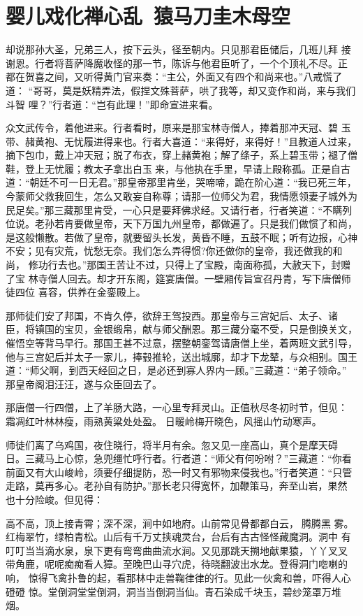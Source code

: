 \chapter{婴儿戏化禅心乱~猿马刀圭木母空}

却说那孙大圣，兄弟三人，按下云头，径至朝内。只见那君臣储后，几班儿拜
接谢恩。行者将菩萨降魔收怪的那一节，陈诉与他君臣听了，一个个顶礼不尽。正
都在贺喜之间，又听得黄门官来奏：“主公，外面又有四个和尚来也。”八戒慌了道：
“哥哥，莫是妖精弄法，假捏文殊菩萨，哄了我等，却又变作和尚，来与我们斗智
哩？”行者道：“岂有此理！”即命宣进来看。

众文武传令，着他进来。行者看时，原来是那宝林寺僧人，捧着那冲天冠、碧
玉带、赭黄袍、无忧履进得来也。行者大喜道：“来得好，来得好！”且教道人过来，
摘下包巾，戴上冲天冠；脱了布衣，穿上赭黄袍；解了绦子，系上碧玉带；褪了僧
鞋，登上无忧履；教太子拿出白玉来，与他执在手里，早请上殿称孤。正是自古
道：“朝廷不可一日无君。”那皇帝那里肯坐，哭啼啼，跪在阶心道：“我已死三年，
今蒙师父救我回生，怎么又敢妄自称尊；请那一位师父为君，我情愿领妻子城外为
民足矣。”那三藏那里肯受，一心只是要拜佛求经。又请行者，行者笑道：“不瞒列
位说。老孙若肯要做皇帝，天下万国九州皇帝，都做遍了。只是我们做惯了和尚，
是这般懒散。若做了皇帝，就要留头长发，黄昏不睡，五鼓不眠；听有边报，心神
不安；见有灾荒，忧愁无奈。我们怎么弄得惯?你还做你的皇帝，我还做我的和尚，
修功行去也。”那国王苦让不过，只得上了宝殿，南面称孤，大赦天下，封赠了宝
林寺僧人回去。却才开东阁，筵宴唐僧。一壁厢传旨宣召丹青，写下唐僧师徒四位
喜容，供养在金銮殿上。

那师徒们安了邦国，不肯久停，欲辞王驾投西。那皇帝与三宫妃后、太子、诸
臣，将镇国的宝贝，金银缎帛，献与师父酬恩。那三藏分毫不受，只是倒换关文，
催悟空等背马早行。那国王甚不过意，摆整朝銮驾请唐僧上坐，着两班文武引导，
他与三宫妃后并太子一家儿，捧毂推轮，送出城廓，却才下龙辇，与众相别。国王
道：“师父啊，到西天经回之日，是必还到寡人界内一顾。”三藏道：“弟子领命。”
那皇帝阁泪汪汪，遂与众臣回去了。

那唐僧一行四僧，上了羊肠大路，一心里专拜灵山。正值秋尽冬初时节，但见：
霜凋红叶林林瘦，雨熟黄粱处处盈。
日暖岭梅开晓色，风摇山竹动寒声。

师徒们离了乌鸡国，夜住晓行，将半月有余。忽又见一座高山，真个是摩天碍
日。三藏马上心惊，急兜缰忙呼行者。行者道：“师父有何吩咐？”三藏道：“你看
前面又有大山峻岭，须要仔细提防，恐一时又有邪物来侵我也。”行者笑道：“只管
走路，莫再多心。老孙自有防护。”那长老只得宽怀，加鞭策马，奔至山岩，果然
也十分险峻。但见得：

高不高，顶上接青霄；深不深，涧中如地府。山前常见骨都都白云，腾腾黑
雾。红梅翠竹，绿柏青松。山后有千万丈挟魂灵台，台后有古古怪怪藏魔洞。洞中
有叮叮当当滴水泉，泉下更有弯弯曲曲流水涧。又见那跳天搠地献果猿，丫丫叉叉
带角鹿，呢呢痴痴看人獐。至晚巴山寻穴虎，待晓翻波出水龙。登得洞门唿喇的响，
惊得飞禽扑鲁的起，看那林中走兽鞠律律的行。见此一伙禽和兽，吓得人心磴磴
惊。堂倒洞堂堂倒洞，洞当当倒洞当仙。青石染成千块玉，碧纱笼罩万堆
烟。

